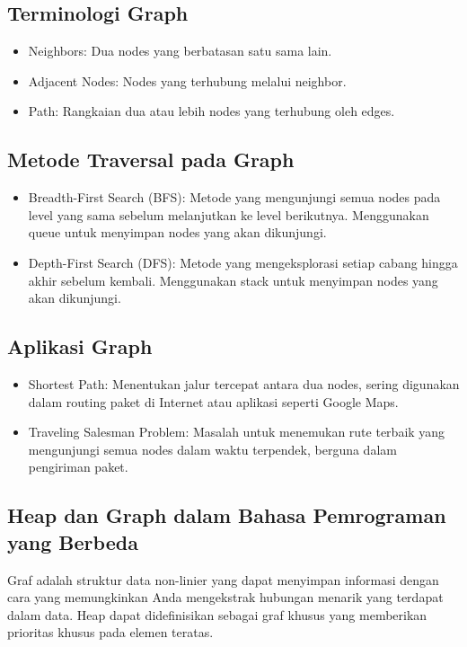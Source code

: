 \documentclass{article}
\begin{document}
\subsection{Terminologi Graph}
\begin{itemize}
    \item Neighbors: Dua nodes yang berbatasan satu sama lain.
    \item Adjacent Nodes: Nodes yang terhubung melalui neighbor.
    \item Path: Rangkaian dua atau lebih nodes yang terhubung oleh edges.
\end{itemize}

\subsection{Metode Traversal pada Graph}
\begin{itemize}
    \item Breadth-First Search (BFS): Metode yang mengunjungi semua nodes pada level yang sama sebelum melanjutkan ke level berikutnya. Menggunakan queue untuk menyimpan nodes yang akan dikunjungi.
    \item Depth-First Search (DFS): Metode yang mengeksplorasi setiap cabang hingga akhir sebelum kembali. Menggunakan stack untuk menyimpan nodes yang akan dikunjungi.
\end{itemize}

\subsection{Aplikasi Graph}
\begin{itemize}
    \item Shortest Path: Menentukan jalur tercepat antara dua nodes, sering digunakan dalam routing paket di Internet atau aplikasi seperti Google Maps.
    \item Traveling Salesman Problem: Masalah untuk menemukan rute terbaik yang mengunjungi semua nodes dalam waktu terpendek, berguna dalam pengiriman paket.
\end{itemize}

\subsection{Heap dan Graph dalam Bahasa Pemrograman yang Berbeda}
Graf adalah struktur data non-linier yang dapat menyimpan informasi dengan cara yang memungkinkan Anda mengekstrak hubungan menarik yang terdapat dalam data. Heap dapat didefinisikan sebagai graf khusus yang memberikan prioritas khusus pada elemen teratas.
\end{document}
